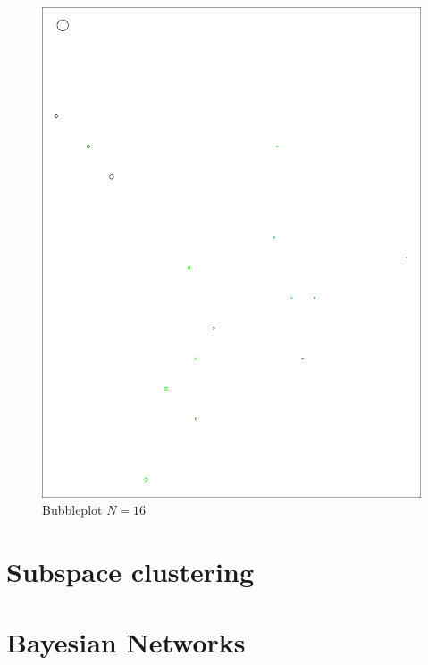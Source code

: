 \documentclass[letterpaper,12pt]{article}
\begin{document}
\begin{figure}[h]
  \centering
  \includegraphics[width=\linewidth]{bubbleplot-16.pdf}
  \caption{Bubbleplot $N = 16$}
  \label{fig:bubbleplot-16}
\end{figure}

\section{Subspace clustering}


\section{Bayesian Networks}
\end{document}
